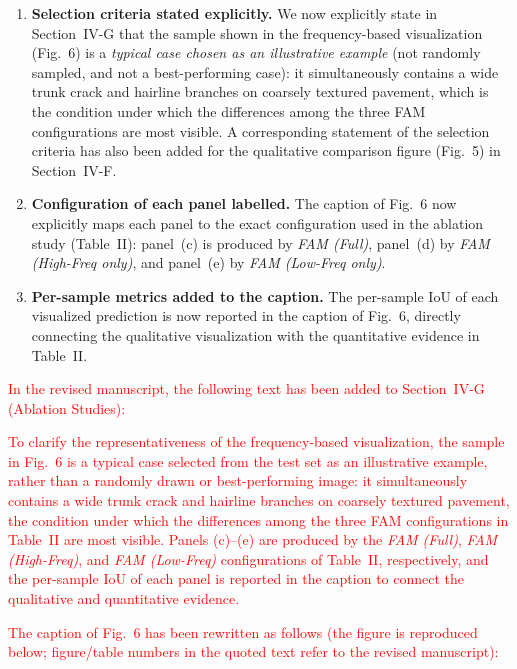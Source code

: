 \documentclass[lettersize,journal,onecolumn,12pt]{IEEEtran}
\begin{document}
\begin{enumerate}
    \item \textbf{Selection criteria stated explicitly.}
    We now explicitly state in Section~IV-G that the sample shown in the frequency-based visualization (Fig.~6) is a
    \emph{typical case chosen as an illustrative example} (not randomly sampled, and not a best-performing case):
    it simultaneously contains a wide trunk crack and hairline branches on coarsely textured pavement, which is the
    condition under which the differences among the three FAM configurations are most visible.
    A corresponding statement of the selection criteria has also been added for the qualitative comparison figure
    (Fig.~5) in Section~IV-F.

    \item \textbf{Configuration of each panel labelled.}
    The caption of Fig.~6 now explicitly maps each panel to the exact configuration used in the ablation study
    (Table~II): panel~(c) is produced by \emph{FAM (Full)}, panel~(d) by \emph{FAM (High-Freq only)}, and panel~(e)
    by \emph{FAM (Low-Freq only)}.

    \item \textbf{Per-sample metrics added to the caption.}
    The per-sample IoU of each visualized prediction is now reported in the caption of Fig.~6, directly connecting
    the qualitative visualization with the quantitative evidence in Table~II.
\end{enumerate}

\textcolor{red}{In the revised manuscript, the following text has been added to Section~IV-G (Ablation Studies):}

\textcolor{red}{
To clarify the representativeness of the frequency-based visualization, the sample in Fig.~6
is a typical case selected from the test set as an illustrative example,
rather than a randomly drawn or best-performing image: it simultaneously contains a wide trunk crack and hairline
branches on coarsely textured pavement, the condition under which the differences among the three FAM configurations
in Table~II are most visible. Panels (c)--(e) are produced by the \emph{FAM (Full)}, \emph{FAM (High-Freq)}, and
\emph{FAM (Low-Freq)} configurations of Table~II, respectively, and the per-sample IoU of each panel is reported in
the caption to connect the qualitative and quantitative evidence.
}

\textcolor{red}{The caption of Fig.~6 has been rewritten as follows (the figure is reproduced below; figure/table numbers in the quoted text refer to the revised manuscript):}
\end{document}
